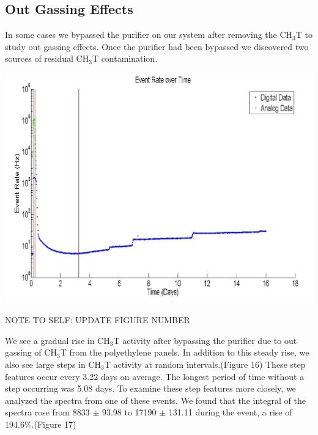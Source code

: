 \documentclass[a4paper,12pt]{article}
\begin{document}
\subsection{Out Gassing Effects}

In some cases we bypassed the purifier on our system after removing the CH$_3$T to study out gassing effects.  Once the purifier had been bypassed we discovered two sources of residual CH$_3$T contamination.  

\begin{center}
\includegraphics[scale=0.5]{Outgassing_TimeHisto_Log.jpg}
\end{center}

NOTE TO SELF: UPDATE FIGURE NUMBER

We see a gradual rise in CH$_3$T activity after bypassing the purifier due to out gassing of CH$_3$T from the polyethylene panels.  In addition to this steady rise, we also see large steps in CH$_3$T activity at random intervals.(Figure 16)  These step features occur every 3.22 days on average.  The longest period of time without a step occurring was 5.08 days. To examine these step features more closely, we analyzed the spectra from one of these events.  We found that the integral of the spectra rose from 8833 $\pm$ 93.98 to 17190 $\pm$ 131.11 during the event, a rise of 194.6\%.(Figure 17)  
\end{document}
